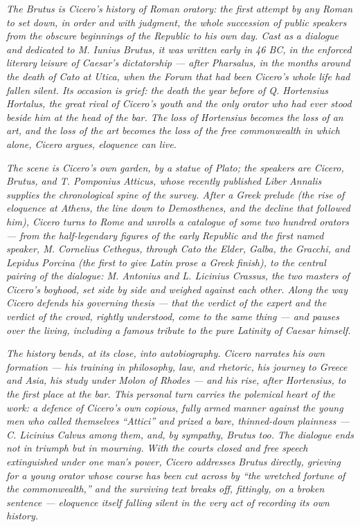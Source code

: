 
\textit{The \textit{Brutus} is Cicero's history of Roman
oratory: the first attempt by any Roman to set down, in order
and with judgment, the whole succession of public speakers from
the obscure beginnings of the Republic to his own day. Cast as
a dialogue and dedicated to M. Iunius Brutus, it was written
early in 46 BC, in the enforced literary leisure of Caesar's
dictatorship --- after Pharsalus, in the months around the
death of Cato at Utica, when the Forum that had been Cicero's
whole life had fallen silent. Its occasion is grief: the death
the year before of Q. Hortensius Hortalus, the great rival of
Cicero's youth and the only orator who had ever stood beside
him at the head of the bar. The loss of Hortensius becomes the
loss of an art, and the loss of the art becomes the loss of the
free commonwealth in which alone, Cicero argues, eloquence can
live.}

\textit{The scene is Cicero's own garden, by a statue of Plato;
the speakers are Cicero, Brutus, and T. Pomponius Atticus, whose
recently published \textit{Liber Annalis} supplies the
chronological spine of the survey. After a Greek prelude (the
rise of eloquence at Athens, the line down to Demosthenes, and
the decline that followed him), Cicero turns to Rome and unrolls
a catalogue of some two hundred orators --- from the half-legendary
figures of the early Republic and the first named speaker, M.
Cornelius Cethegus, through Cato the Elder, Galba, the Gracchi,
and Lepidus Porcina (the first to give Latin prose a Greek finish),
to the central pairing of the dialogue: M. Antonius and L.
Licinius Crassus, the two masters of Cicero's boyhood, set side
by side and weighed against each other. Along the way Cicero
defends his governing thesis --- that the verdict of the expert
and the verdict of the crowd, rightly understood, come to the
same thing --- and pauses over the living, including a famous
tribute to the pure Latinity of Caesar himself.}

\textit{The history bends, at its close, into autobiography.
Cicero narrates his own formation --- his training in philosophy,
law, and rhetoric, his journey to Greece and Asia, his study
under Molon of Rhodes --- and his rise, after Hortensius, to the
first place at the bar. This personal turn carries the polemical
heart of the work: a defence of Cicero's own copious, fully
armed manner against the young men who called themselves
``Attici'' and prized a bare, thinned-down plainness --- C.
Licinius Calvus among them, and, by sympathy, Brutus too. The
dialogue ends not in triumph but in mourning. With the courts
closed and free speech extinguished under one man's power, Cicero
addresses Brutus directly, grieving for a young orator whose
course has been cut across by ``the wretched fortune of the
commonwealth,'' and the surviving text breaks off, fittingly, on
a broken sentence --- eloquence itself falling silent in the very
act of recording its own history.}
